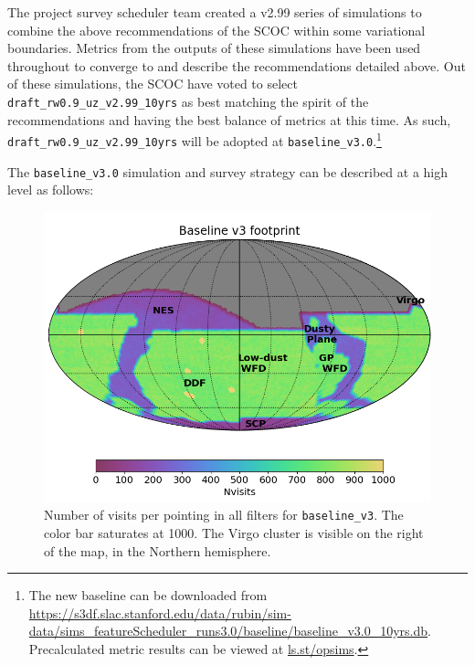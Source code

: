 The project survey scheduler team created a v2.99 series of simulations to combine the above recommendations of the SCOC within some variational boundaries. Metrics from the outputs of these simulations have been used throughout to converge to and describe the recommendations detailed above. Out of these simulations, the SCOC have voted to select \texttt{draft\_rw0.9\_uz\_v2.99\_10yrs} as best matching the spirit of the recommendations and having the best balance of metrics at this time. As such, \texttt{draft\_rw0.9\_uz\_v2.99\_10yrs} will be adopted at \texttt{baseline\_v3.0}.\footnote{The new baseline can be downloaded from \url{https://s3df.slac.stanford.edu/data/rubin/sim-data/sims_featureScheduler_runs3.0/baseline/baseline_v3.0_10yrs.db}. Precalculated metric results can be viewed at \url{ls.st/opsims}.} 



The \texttt{baseline\_v3.0} simulation and survey strategy can be described at a high level as follows:
\begin{figure}[h!]
    \centering
    \includegraphics[width=4.7in]{figures/v3footprint.png}
    \caption{Number of visits per pointing in all filters for \texttt{baseline\_v3}. The color bar saturates at 1000. The Virgo cluster is visible on the right of the map, in the Northern hemisphere.%
    }\label{fig:baselinev3Footprint}
\end{figure}



